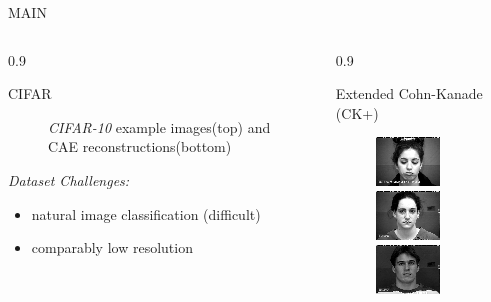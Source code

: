 \documentclass[final]{beamer}
\newlength{\onecolwid}
\newlength{\threecolwid}
\begin{document}
\begin{frame}[t]
\begin{columns}[t]
\begin{column}{\threecolwid}
\begin{alertblock}{MAIN}
\begin{columns}[t, totalwidth=0.9\threecolwid]
\begin{column}{0.9\onecolwid}
\begin{block}{CIFAR}
\begin{figure}
\caption{\emph{CIFAR-10} example images(top) and CAE reconstructions(bottom)}

\end{figure}

\emph{Dataset Challenges:}
\begin{itemize}
\item natural image classification (difficult)
\item comparably low resolution
\end{itemize}
\end{block}
\end{column}

\begin{column}{0.9\onecolwid}
\begin{block}{Extended Cohn-Kanade (CK+)}
\begin{figure}
\centering
\includegraphics[width=0.3\linewidth]{graphics/reconstructions/ckplus/input_00.png}
\includegraphics[width=0.3\linewidth]{graphics/reconstructions/ckplus/input_01.png}
\includegraphics[width=0.3\linewidth]{graphics/reconstructions/ckplus/input_02.png}


\end{figure}
\end{block}
\end{column}
\end{columns}
\end{alertblock}
\end{column}
\end{columns}
\end{frame}
\end{document}
